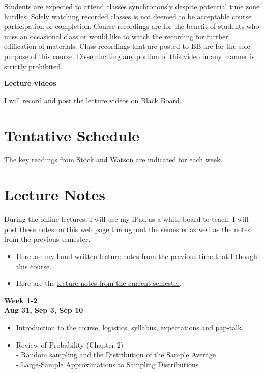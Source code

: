 \documentclass[
]{book}
\providecommand{\tightlist}{%
  \setlength{\itemsep}{0pt}\setlength{\parskip}{0pt}}
\begin{document}
Students are expected to attend classes synchronously despite potential time zone hurdles. Solely watching recorded classes is not deemed to be acceptable course participation or completion. Course recordings are for the benefit of students who miss an occasional class or would like to watch the recording for further edification of materials. Class recordings that are posted to BB are for the sole purpose of this course. Disseminating any portion of this video in any manner is strictly prohibited.

\textbf{Lecture videos}

I will record and post the lecture videos on Black Board.

\hypertarget{tentative-schedule}{%
\section*{Tentative Schedule}\label{tentative-schedule}}

The key readings from Stock and Watson are indicated for each week.

\hypertarget{lecture-notes}{%
\section*{Lecture Notes}\label{lecture-notes}}

During the online lectures, I will use my iPad as a white board to teach. I will post these notes on this web page throughout the semester as well as the notes from the previous semester.

\begin{itemize}
\item
  Here are my \href{https://www.dropbox.com/s/kng2oynyxrtiir5/EC\%20282\%20SPRING\%202020.pdf?dl=0}{hand-written lecture notes from the previous time} that I thought this course.
\item
  Here are the \href{https://www.dropbox.com/s/e5c8qax19lkrrn3/EC\%20282\%20FALL\%202020.pdf?dl=0}{lecture notes from the current semester}.
\end{itemize}

\textbf{Week 1-2}\\
\textbf{Aug 31, Sep 3, Sep 10}

\begin{itemize}
\tightlist
\item
  Introduction to the course, logistics, syllabus, expectations and pap-talk.\\
\item
  Review of Probability (Chapter 2)\\
  - Random sampling and the Distribution of the Sample Average\\
  - Large-Sample Approximations to Sampling Distributions
\end{itemize}
\end{document}
